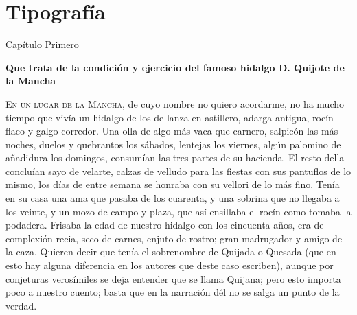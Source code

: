 \documentclass[a4paper,12pt]{article} %
\begin{document}
\section{Tipografía}

Capítulo Primero 

\textbf{Que trata de la condición y ejercicio del famoso hidalgo D. Quijote de la Mancha}

\textsc{En un lugar de la Mancha}, de cuyo nombre no quiero acordarme, no ha mucho tiempo que vivía un hidalgo de los de lanza en astillero, adarga antigua, rocín flaco y galgo corredor. Una olla de algo más vaca que carnero, salpicón las más noches, duelos y quebrantos los sábados, lentejas los viernes, algún palomino de añadidura los domingos, consumían las tres partes de su hacienda. El resto della concluían sayo de velarte, calzas de velludo para las fiestas con sus pantuflos de lo mismo, los días de entre semana se honraba con su vellori de lo más fino. Tenía en su casa una ama que pasaba de los cuarenta, y una sobrina que no llegaba a los veinte, y un mozo de campo y plaza, que así ensillaba el rocín como tomaba la podadera. Frisaba la edad de nuestro hidalgo con los cincuenta años, era de complexión recia, seco de carnes, enjuto de rostro; gran madrugador y amigo de la caza. Quieren decir que tenía el sobrenombre de Quijada o Quesada (que en esto hay alguna diferencia en los autores que deste caso escriben), aunque por conjeturas verosímiles se deja entender que se llama Quijana; pero esto importa poco a nuestro cuento; basta que en la narración dél no se salga un punto de la verdad.
\end{document}
